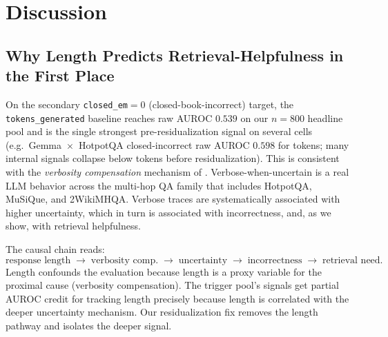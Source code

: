 \documentclass[11pt]{article}
\begin{document}
\section{Discussion}
\label{sec:discussion}

\subsection{Why Length Predicts Retrieval-Helpfulness in the First Place}
\label{sec:discussion-causal}

On the secondary \texttt{closed\_em}$=0$ (closed-book-incorrect) target,
the \texttt{tokens\_generated} baseline reaches raw AUROC $0.539$ on our
$n{=}800$ headline pool and is the single strongest pre-residualization
signal on several cells (e.g.\ Gemma~$\times$~HotpotQA closed-incorrect raw
AUROC $0.598$ for tokens; many internal signals collapse below tokens before
residualization). This is consistent with the \emph{verbosity compensation}
mechanism of
\cite{Zhang_VerbosityVeracityVCBehavior}. Verbose-when-uncertain is a real
LLM behavior across the multi-hop QA family that includes HotpotQA, MuSiQue,
and 2WikiMHQA. Verbose traces are systematically associated with higher
uncertainty, which in turn is associated with incorrectness, and, as we show,
with retrieval helpfulness.

The causal chain reads:
\begin{equation*}
\text{response length} \;\to\; \text{verbosity comp.} \;\to\; \text{uncertainty} \;\to\; \text{incorrectness} \;\to\; \text{retrieval need}.
\end{equation*}
Length confounds the evaluation because length is a proxy variable for the
proximal cause (verbosity compensation). The trigger pool's signals get
partial AUROC credit for tracking length precisely because length is
correlated with the deeper uncertainty mechanism. Our residualization fix
removes the length pathway and isolates the deeper signal.

\end{document}
